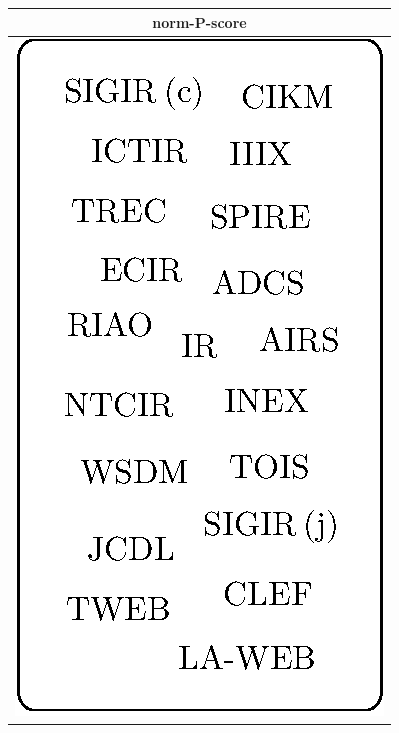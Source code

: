 \begin{tabular}{c}
\toprule
norm-P-score \\ 
\midrule
\multirow{20}{*}{\includegraphics{fig/ir-norm-venues-blob.eps}} \\ %
\\
\\
\\
\\
\\
\\
\\
\\
\\
\\
\\
\\
\\
\\
\\
\\
\\
\\
\\
\bottomrule
\end{tabular} \ \
